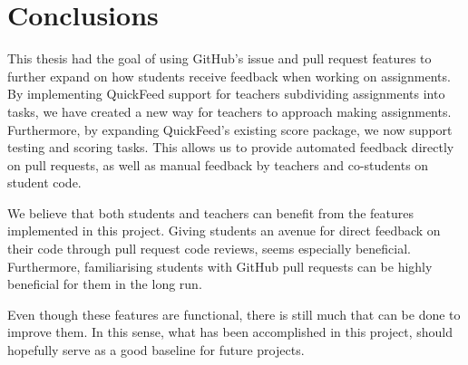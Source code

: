 
\chapter{Conclusions}
\label{ch:conclusion}

This thesis had the goal of using GitHub's issue and pull request features to further expand on how students receive feedback when working on assignments.
By implementing QuickFeed support for teachers subdividing assignments into tasks, we have created a new way for teachers to approach making assignments.
Furthermore, by expanding QuickFeed's existing score package, we now support testing and scoring tasks.
This allows us to provide automated feedback directly on pull requests, as well as manual feedback by teachers and co-students on student code.

We believe that both students and teachers can benefit from the features implemented in this project.
Giving students an avenue for direct feedback on their code through pull request code reviews, seems especially beneficial.
Furthermore, familiarising students with GitHub pull requests can be highly beneficial for them in the long run.

Even though these features are functional, there is still much that can be done to improve them.
In this sense, what has been accomplished in this project, should hopefully serve as a good baseline for future projects.
